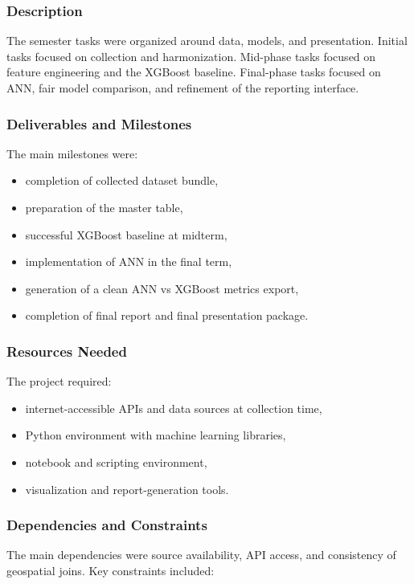 \documentclass[12pt,a4paper]{report}
\begin{document}
\subsubsection{Description}
The semester tasks were organized around data, models, and presentation. Initial tasks focused on collection and harmonization. Mid-phase tasks focused on feature engineering and the XGBoost baseline. Final-phase tasks focused on ANN, fair model comparison, and refinement of the reporting interface.

\subsubsection{Deliverables and Milestones}
The main milestones were:

\begin{itemize}[leftmargin=1.3cm]
    \item completion of collected dataset bundle,
    \item preparation of the master table,
    \item successful XGBoost baseline at midterm,
    \item implementation of ANN in the final term,
    \item generation of a clean ANN vs XGBoost metrics export,
    \item completion of final report and final presentation package.
\end{itemize}

\subsubsection{Resources Needed}
The project required:

\begin{itemize}[leftmargin=1.3cm]
    \item internet-accessible APIs and data sources at collection time,
    \item Python environment with machine learning libraries,
    \item notebook and scripting environment,
    \item visualization and report-generation tools.
\end{itemize}

\subsubsection{Dependencies and Constraints}
The main dependencies were source availability, API access, and consistency of geospatial joins. Key constraints included:
\end{document}
